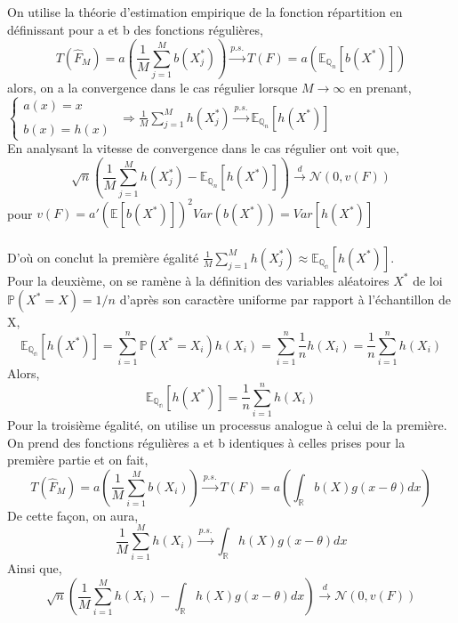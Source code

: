 \documentclass{article}
\newcommand{\mean}{\mathbb{E}}
\begin{document}
\subsection{}
On utilise la théorie d'estimation empirique de la fonction répartition en définissant pour a et b des fonctions régulières,
$$T(\hat F_{M})=a\left(\frac{1}{M}\sum_{j=1}^{M}b(X_{j}^{*})\right)\overset{p.s.}{\longrightarrow}T(F)=a\left(\mean_{\mathbb{Q}_{n}} [b(X^{*})]\right)$$
alors, on a la convergence dans le cas régulier lorsque $\displaystyle M\to \infty$ en prenant,
\\

$ \left\{
\begin{array}{ll}
\displaystyle a(x)=x \\ \\
\displaystyle b(x)=h(x)
\end{array}
\right.
$
$\Longrightarrow \frac{1}{M}\sum_{j=1}^{M}h(X_{j}^{*})\overset{p.s.}{\longrightarrow}\mean_{\mathbb{Q}_n} [h(X^{*})]$
\vspace{0.5 cm}
\\
En analysant la vitesse de convergence dans le cas régulier ont voit que,
$$\sqrt{n}\left(\frac{1}{M}\sum_{j=1}^{M}h(X_{j}^{*})-\mean_{\mathbb{Q}_{n}} [h(X^{*})]\right)\overset{d}{\longrightarrow}\mathcal{N}(0,v(F))$$
pour $\displaystyle v(F)=a'(\mean[b(X^{*})])^2Var(b(X^{*}))=Var[h(X^{*})]$ \\ \\
D'où on conclut la première égalité $\displaystyle \frac{1}{M}\sum_{j=1}^{M}h(X_{j}^{*}) \approx \mean_{\mathbb{Q_{n}}} [h(X^{*})]$.
\\
Pour la deuxième, on se ramène à la définition des variables aléatoires $\displaystyle X^*$ de loi $\displaystyle \mathbb{P}(X^*=X)=1/n$ d'après son caractère uniforme par rapport à l'échantillon de X,
$$\mean_{\mathbb{Q_{n}}} [h(X^{*})]=\sum_{i=1}^{n}\mathbb{P}(X^*=X_i)h(X_i)=\sum_{i=1}^{n}\frac{1}{n}h(X_i)=\frac{1}{n}\sum_{i=1}^{n}h(X_i)$$
Alors,
$$\mean_{\mathbb{Q_{n}}} [h(X^{*})]=\frac{1}{n}\sum_{i=1}^{n}h(X_i)$$
Pour la troisième égalité, on utilise un processus analogue à celui de la première. On prend des fonctions régulières a et b identiques à celles prises pour la première partie et on fait,
$$T(\hat F_{M})=a\left(\frac{1}{M}\sum_{i=1}^{M}b(X_{i})\right)\overset{p.s.}{\longrightarrow}T(F)=a\left(\int_{\mathbb{R}} b(X)g(x-\theta)dx\right)$$
De cette façon, on aura,
$$ \frac{1}{M}\sum_{i=1}^{M}h(X_{i})\overset{p.s.}{\longrightarrow}\int_{\mathbb{R}} h(X)g(x-\theta)dx$$
Ainsi que,
$$\sqrt{n}\left(\frac{1}{M}\sum_{i=1}^{M}h(X_{i})-\int_{\mathbb{R}} h(X)g(x-\theta)dx\right)\overset{d}{\longrightarrow}\mathcal{N}(0,v(F))$$
\end{document}
